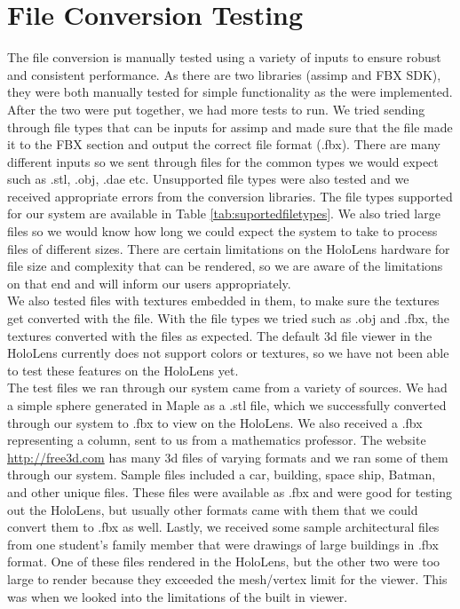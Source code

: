 
\section{File Conversion Testing}
\tab
    The file conversion is manually tested using a variety of inputs to ensure robust and consistent performance. As there are two libraries (assimp and FBX SDK), they were both manually tested for simple functionality as the were implemented. After the two were put together, we had more tests to run. We tried sending through file types that can be inputs for assimp and made sure that the file made it to the FBX section and output the correct file format (.fbx). There are many different inputs so we sent through files for the common types we would expect such as .stl, .obj, .dae etc. Unsupported file types were also tested and we received appropriate errors from the conversion libraries. The file types supported for our system are available in Table \ref{tab:suportedfiletypes}. We also tried large files so we would know how long we could expect the system to take to process files of different sizes. There are certain limitations on the HoloLens hardware for file size and complexity that can be rendered, so we are aware of the limitations on that end and will inform our users appropriately.\\ 
    
    We also tested files with textures embedded in them, to make sure the textures get converted with the file. With the file types we tried such as .obj and .fbx, the textures converted with the files as expected. The default 3d file viewer in the HoloLens currently does not support colors or textures, so we have not been able to test these features on the HoloLens yet.\\

    The test files we ran through our system came from a variety of sources. We had a simple sphere generated in Maple as a .stl file, which we successfully converted through our system to .fbx to view on the HoloLens. We also received a .fbx representing a column, sent to us from a mathematics professor. The website \url{http://free3d.com} has many 3d files of varying formats and we ran some of them through our system. Sample files included a car, building, space ship, Batman, and other unique files. These files were available as .fbx and were good for testing out the HoloLens, but usually other formats came with them that we could convert them to .fbx as well. Lastly, we received some sample architectural files from one student's family member that were drawings of large buildings in .fbx format. One of these files rendered in the HoloLens, but the other two were too large to render because they exceeded the mesh/vertex limit for the viewer. This was when we looked into the limitations of the built in viewer.\\


